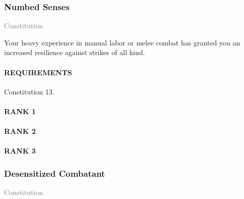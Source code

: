 

\subsubsection{Numbed Senses} \label{tal::numbedsenses}
\small{\textcolor{gray}{Constitution}}

\normalsize
Your heavy experience in manual labor or melee combat has granted you an increased resilience against strikes of all kind.
\paragraph{REQUIREMENTS} Constitution 13.
\paragraph{RANK 1}
\paragraph{RANK 2}
\paragraph{RANK 3}

\subsubsection{Desensitized Combatant} \label{tal::desensitizedcombatant}
\small{\textcolor{gray}{Constitution}}

